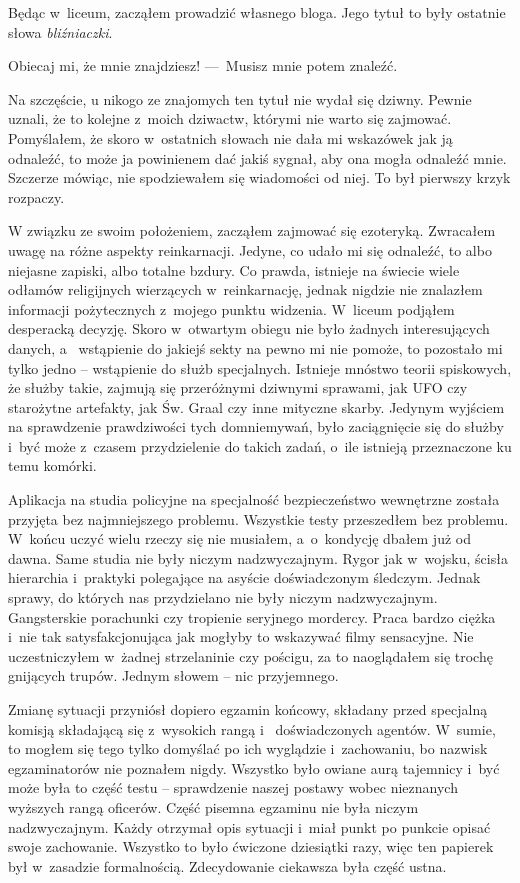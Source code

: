 Będąc w~liceum, zacząłem prowadzić własnego bloga. Jego tytuł to były ostatnie słowa \emph{bliźniaczki}. 

\begin{itquote}
Obiecaj mi, że mnie znajdziesz!
---~Musisz mnie potem znaleźć.
\end{itquote}

Na szczęście, u nikogo ze znajomych ten tytuł nie wydał się dziwny. Pewnie uznali, że to kolejne z~moich dziwactw, 
którymi nie warto się zajmować. Pomyślałem, że skoro w~ostatnich słowach nie dała mi wskazówek jak ją odnaleźć, to 
może ja powinienem dać jakiś sygnał, aby ona mogła odnaleźć mnie. Szczerze mówiąc, nie spodziewałem się wiadomości od 
niej. To był pierwszy krzyk rozpaczy. 

W związku ze swoim położeniem, zacząłem zajmować się ezoteryką. Zwracałem uwagę na różne aspekty reinkarnacji. 
Jedyne, co udało mi się odnaleźć, to albo niejasne zapiski, albo totalne bzdury. Co prawda, istnieje na świecie wiele 
odłamów religijnych wierzących w~reinkarnację, jednak nigdzie nie znalazłem informacji pożytecznych z~mojego punktu 
widzenia. W~liceum podjąłem desperacką decyzję. Skoro w~otwartym obiegu nie było żadnych interesujących danych, a~
wstąpienie do jakiejś sekty na pewno mi nie pomoże, to pozostało mi tylko jedno -- wstąpienie do służb specjalnych. 
Istnieje mnóstwo teorii spiskowych, że służby takie, zajmują się przeróżnymi dziwnymi sprawami, jak UFO czy 
starożytne artefakty, jak Św. Graal czy inne mityczne skarby. Jedynym wyjściem na sprawdzenie prawdziwości tych 
domniemywań, było zaciągnięcie się do służby i~być może z~czasem przydzielenie do takich zadań, o~ile istnieją 
przeznaczone ku temu komórki. 

Aplikacja na studia policyjne na specjalność bezpieczeństwo wewnętrzne została przyjęta bez najmniejszego problemu. 
Wszystkie testy przeszedłem bez problemu. W~końcu uczyć wielu rzeczy się nie musiałem, a~o~kondycję dbałem już od 
dawna. Same studia nie były niczym nadzwyczajnym. Rygor jak w~wojsku, ścisła hierarchia i~praktyki polegające na 
asyście doświadczonym śledczym. Jednak sprawy, do których nas przydzielano nie były niczym nadzwyczajnym. 
Gangsterskie porachunki czy tropienie seryjnego mordercy. Praca bardzo ciężka i~nie tak satysfakcjonująca jak mogłyby 
to wskazywać filmy sensacyjne. Nie uczestniczyłem w~żadnej strzelaninie czy pościgu, za to naoglądałem się trochę 
gnijących trupów. Jednym słowem -- nic przyjemnego. 

Zmianę sytuacji przyniósł dopiero egzamin końcowy, składany przed specjalną komisją składającą się z~wysokich rangą i~
doświadczonych agentów. W~sumie, to mogłem się tego tylko domyślać po ich wyglądzie i~zachowaniu, bo nazwisk 
egzaminatorów nie poznałem nigdy. Wszystko było owiane aurą tajemnicy i~być może była to część testu -- sprawdzenie 
naszej postawy wobec nieznanych wyższych rangą oficerów. Część pisemna egzaminu nie była niczym nadzwyczajnym. Każdy 
otrzymał opis sytuacji i~miał punkt po punkcie opisać swoje zachowanie. Wszystko to było ćwiczone dziesiątki razy, 
więc ten papierek był w~zasadzie formalnością. Zdecydowanie ciekawsza była część ustna. 

